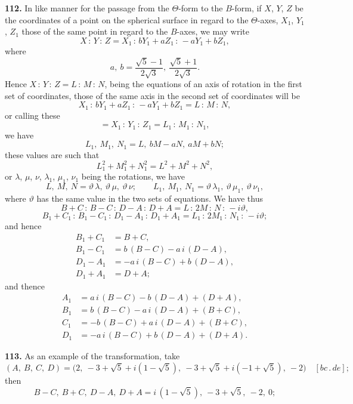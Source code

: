 \documentclass[11pt]{article}
\newcommand{\artno}[1]{\textbf{#1.}\quad}
\begin{document}
\bigskip
\noindent
\artno{112} In like manner for the passage from the $\Theta$-form to the
$B$-form, if $X$, $Y$, $Z$ be the coordinates of a point on the spherical
surface in regard to the $\Theta$-axes, $X_{1}$, $Y_{1}$, $Z_{1}$ those of
the same point in regard to the $B$-axes, we may write
\[
  X\, :\, Y\, :\, Z = X_{1}\,:\, b Y_{1} + a Z_{1}\,:\, -a Y_{1} + b Z_{1},
\]
where
\[
  a,\ b = \frac{\sqrt{5} - 1}{2\sqrt{3}},\ \frac{\sqrt{5} + 1}{2\sqrt{3}}.
\]
Hence $X\,:\, Y\,:\, Z = L\,:\, M\,:\, N$, being the equations of an axis of
rotation in the first set of coordinates, those of the same axis in the
second set of coordinates will be
\[
  X_{1}\,:\, b Y_{1} + a Z_{1}\,:\, -a Y_{1} + b Z_{1} = L\,:\, M\,:\, N,
\]
or calling these
\[
  = X_{1}\,:\, Y_{1}\,:\, Z_{1} = L_{1}\,:\, M_{1}\,:\, N_{1},
\]
we have
\[
  L_{1},\ M_{1},\ N_{1} = L,\ b M - a N,\ a M + b N;
\]
these values are such that
\[
  L_{1}^{2} + M_{1}^{2} + N_{1}^{2} = L^{2} + M^{2} + N^{2},
\]
or $\lambda$, $\mu$, $\nu$, $\lambda_{1}$, $\mu_{1}$, $\nu_{1}$ being the
rotations, we have
\[
  L,\ M,\ N = \vartheta\,\lambda,\ \vartheta\,\mu,\ \vartheta\,\nu;\qquad
  L_{1},\ M_{1},\ N_{1} = \vartheta\,\lambda_{1},\ \vartheta\,\mu_{1},\ \vartheta\,\nu_{1},
\]
where $\vartheta$ has the same value in the two sets of equations.
We have thus
\[
  B + C\,:\, B - C\,:\, D - A\,:\, D + A
  = L\,:\, 2M\,:\, N\,:\, -i\vartheta,
\]
\[
  B_{1} + C_{1}\,:\, B_{1} - C_{1}\,:\, D_{1} - A_{1}\,:\, D_{1} + A_{1}
  = L_{1}\,:\, 2M_{1}\,:\, N_{1}\,:\, -i\vartheta;
\]
and hence
\begin{align*}
  B_{1} + C_{1} &= B + C,\\
  B_{1} - C_{1} &= b\,(B - C) - a\,i\,(D - A),\\
  D_{1} - A_{1} &= -a\,i\,(B - C) + b\,(D - A),\\
  D_{1} + A_{1} &= D + A;
\end{align*}
and thence
\begin{align*}
  A_{1} &= a\,i\,(B - C) - b\,(D - A) + (D + A),\\
  B_{1} &= b\,(B - C) - a\,i\,(D - A) + (B + C),\\
  C_{1} &= -b\,(B - C) + a\,i\,(D - A) + (B + C),\\
  D_{1} &= -a\,i\,(B - C) + b\,(D - A) + (D + A).
\end{align*}

\medskip
\noindent
\artno{113} As an example of the transformation, take
\[
  (A,\ B,\ C,\ D) = \bigl(2,\ -3 + \sqrt{5} + i(1 - \sqrt{5}),
  \ -3 + \sqrt{5} + i(-1 + \sqrt{5}),\ -2\bigr)\quad [bc\,.\,de];
\]
then
\[
  B - C,\ B + C,\ D - A,\ D + A
  = i\,(1 - \sqrt{5}),\ -3 + \sqrt{5},\ -2,\ 0;
\]
\end{document}
